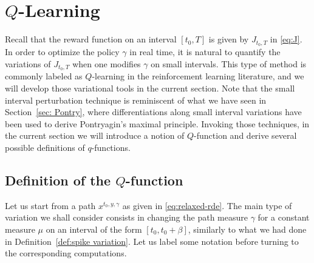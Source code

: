 \documentclass[12pt,reqno]{amsart}
\numberwithin{equation}{section}  %
\newcommand{\1}{{\bf 1}}
\newcommand{\2}{{\bf 2}}
\newcommand{\ga}{\gamma}
\theoremstyle{remark}
\theoremstyle{remark}
\begin{document}
\section{$Q$-Learning}\label{sec:Q}
Recall that the reward function on an interval $[t_{0},T]$ is given by $J_{t_{0},T}$ in \eqref{eq:J}. In order to optimize the policy $\ga$ in real time, it is natural  to quantify the variations of $J_{t_0,T}$ when one modifies $\ga$ on small intervals. This type of method is commonly labeled as $Q$-learning in the reinforcement learning literature, and we will develop those variational tools in the current section. Note that the small interval perturbation technique is reminiscent of what we have seen in Section~\ref{sec: Pontry}, where differentiations along small interval variations have been used to derive Pontryagin's maximal principle. Invoking those techniques, in the current section we will introduce a notion of $Q$-function and derive several possible definitions of $q$-functions.



\subsection{Definition of the $Q$-function}
Let us start from a path $x^{t_0,y,\ga}$ as given in \eqref{eq:relaxed-rde}. The main type of variation we shall consider consists in changing the {path measure} $\ga$ for a constant measure $\mu$ on an interval of the form $[t_0, t_0+\beta]$, similarly to what we had done in Definition~\ref{def:spike variation}. Let us label some notation before turning to the corresponding computations. 
\end{document}
